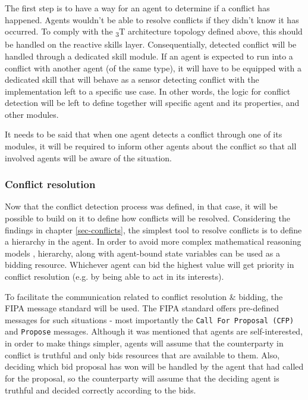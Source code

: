 \documentclass[main.tex]{subfiles}
\begin{document}
The first step is to have a way for an agent to determine if a conflict has happened. Agents wouldn't be 
able to resolve conflicts if they didn't know it has occurred. To comply with the \textsubscript{3}T
architecture topology defined above, this should be handled on the reactive skills layer. 
Consequentially, detected conflict will be handled through a dedicated skill module. If an
agent is expected to run into a conflict with another agent (of the same 
 type), it will have to be equipped with a dedicated skill that will behave as a sensor detecting conflict 
with the implementation left to a specific use case. In other words, the logic for conflict detection will be 
left to define together will specific agent and its properties, and other modules.

It needs to be said that when one agent detects a conflict through one of its modules, it will 
be required to inform other agents about the conflict so that all involved agents will be
aware of the situation. 

\subsubsection{Conflict resolution}

Now that the conflict detection process was defined, in that case, it will be possible to build
on it to define how conflicts will be resolved. Considering the findings in chapter
\ref{sec-conflicts}, the simplest tool to resolve conflicts is to define a hierarchy in the
agent. In order to avoid more complex mathematical reasoning models \cite{Binder2022},
hierarchy, along with agent-bound state variables can be used as a bidding resource. Whichever
agent can bid the highest value will get priority in conflict resolution (e.g. by being
able to act in its interests).

To facilitate the communication related to conflict resolution \& bidding, the FIPA message
standard will be used.  The FIPA standard offers pre-defined messages for such situations -
most importantly the \texttt{Call For Proposal (CFP)} and \texttt{Propose} messages. Although
it was mentioned that agents are self-interested, in order to make things simpler, agents will
assume that the counterparty in conflict is truthful and only bids resources that are
available to them. Also, deciding which bid proposal has won will be handled by the agent that
had called for the proposal, so the counterparty will assume that the deciding agent is
truthful and decided correctly according to the bids. 
\end{document}
